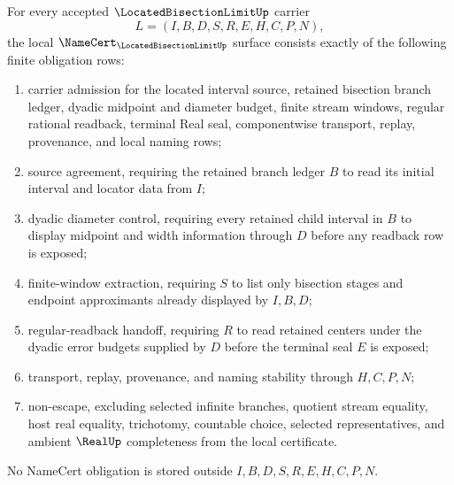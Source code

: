 \begin{theorem}
\label{thm:located-bisection-limit-namecert-obligations}
For every accepted $\LocatedBisectionLimitUp$ carrier
$$
L=(I,B,D,S,R,E,H,C,P,N),
$$
the local $\NameCert_{\LocatedBisectionLimitUp}$ surface consists exactly of the following finite obligation rows:
\begin{enumerate}
\item carrier admission for the located interval source, retained bisection branch ledger, dyadic midpoint and diameter budget, finite stream windows, regular rational readback, terminal Real seal, componentwise transport, replay, provenance, and local naming rows;
\item source agreement, requiring the retained branch ledger $B$ to read its initial interval and locator data from $I$;
\item dyadic diameter control, requiring every retained child interval in $B$ to display midpoint and width information through $D$ before any readback row is exposed;
\item finite-window extraction, requiring $S$ to list only bisection stages and endpoint approximants already displayed by $I,B,D$;
\item regular-readback handoff, requiring $R$ to read retained centers under the dyadic error budgets supplied by $D$ before the terminal seal $E$ is exposed;
\item transport, replay, provenance, and naming stability through $H,C,P,N$;
\item non-escape, excluding selected infinite branches, quotient stream equality, host real equality, trichotomy, countable choice, selected representatives, and ambient $\RealUp$ completeness from the local certificate.
\end{enumerate}
No NameCert obligation is stored outside $I,B,D,S,R,E,H,C,P,N$.
\end{theorem}

